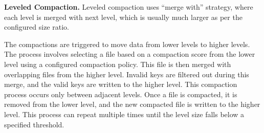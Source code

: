 \textbf{Leveled Compaction.} Leveled compaction uses ``merge with'' strategy, where each level is merged with 
next level, which is usually much larger as per the configured size ratio.

The compactions are triggered to move data from lower levels to higher levels. The process involves selecting a file 
based on a compaction score from the lower level using a configured compaction policy. This file is then merged with 
overlapping files from the higher level. Invalid keys are filtered out during this merge, and the valid keys are 
written to the higher level. This compaction process occurs only between adjacent levels. Once a file is compacted, 
it is removed from the lower level, and the new compacted file is written to the higher level. This process can repeat
multiple times until the level size falls below a specified threshold.